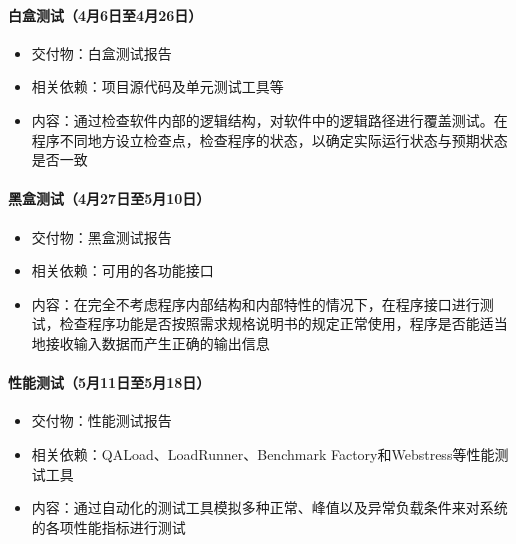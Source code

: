 \documentclass[hyperref, a4paper]{ctexart}
\providecommand{\tightlist}{%
  \setlength{\itemsep}{0pt}\setlength{\parskip}{0pt}}
\let\oldparagraph\paragraph
\renewcommand{\paragraph}[1]{\oldparagraph{#1}\mbox{}}
\begin{document}
\hypertarget{ux767dux76d2ux6d4bux8bd54ux67086ux65e5ux81f34ux670826ux65e5}{%
\paragraph{白盒测试（4月6日至4月26日）}\label{ux767dux76d2ux6d4bux8bd54ux67086ux65e5ux81f34ux670826ux65e5}}

\begin{itemize}
\tightlist
\item
  交付物：白盒测试报告
\item
  相关依赖：项目源代码及单元测试工具等
\item
  内容：通过检查软件内部的逻辑结构，对软件中的逻辑路径进行覆盖测试。在程序不同地方设立检查点，检查程序的状态，以确定实际运行状态与预期状态是否一致
\end{itemize}

\hypertarget{ux9ed1ux76d2ux6d4bux8bd54ux670827ux65e5ux81f35ux670810ux65e5}{%
\paragraph{黑盒测试（4月27日至5月10日）}\label{ux9ed1ux76d2ux6d4bux8bd54ux670827ux65e5ux81f35ux670810ux65e5}}

\begin{itemize}
\tightlist
\item
  交付物：黑盒测试报告
\item
  相关依赖：可用的各功能接口
\item
  内容：在完全不考虑程序内部结构和内部特性的情况下，在程序接口进行测试，检查程序功能是否按照需求规格说明书的规定正常使用，程序是否能适当地接收输入数据而产生正确的输出信息
\end{itemize}

\hypertarget{ux6027ux80fdux6d4bux8bd55ux670811ux65e5ux81f35ux670818ux65e5}{%
\paragraph{性能测试（5月11日至5月18日）}\label{ux6027ux80fdux6d4bux8bd55ux670811ux65e5ux81f35ux670818ux65e5}}

\begin{itemize}
\tightlist
\item
  交付物：性能测试报告
\item
  相关依赖：QALoad、LoadRunner、Benchmark
  Factory和Webstress等性能测试工具
\item
  内容：通过自动化的测试工具模拟多种正常、峰值以及异常负载条件来对系统的各项性能指标进行测试
\end{itemize}
\end{document}
